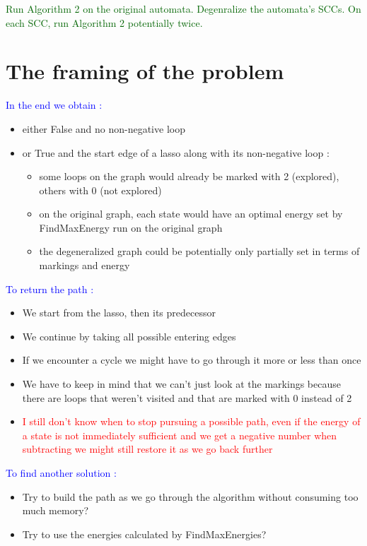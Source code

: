 \documentclass{rapport}
\begin{document}
\vspace{12pt}

\textcolor[HTML]{006400}{Run Algorithm 2 on the original automata. Degenralize the automata’s SCCs. On each SCC, run Algorithm 2 potentially twice.}\\

\newpage

\section{The framing of the problem}

\textcolor{blue}{In the end we obtain :}\\
\begin{itemize}
    \item either False and no non-negative loop
    \item or True and the start edge of a lasso along with its non-negative loop :
    \begin{itemize}
        \item some loops on the graph would already be marked with 2 (explored), others with 0 (not explored)
        \item on the original graph, each state would have an optimal energy set by FindMaxEnergy run on the original graph
        \item the degeneralized graph could be potentially only partially set in terms of markings and energy 
    \end{itemize}
\end{itemize}

\vspace{12pt}

\textcolor{blue}{To return the path :}\\ 
\begin{itemize}
    \item We start from the lasso, then its predecessor
    \item We continue by taking all possible entering edges
    \item If we encounter a cycle we might have to go through it more or less than once
    \item We have to keep in mind that we can't just look at the markings because there are loops that weren't visited and that are marked with 0 instead of 2
    \item \textcolor{red}{I still don’t know when to stop pursuing a possible path, even if the energy of a state is not immediately sufficient and we get a negative number when subtracting we might still restore it as we go back further}
\end{itemize}

\vspace{12pt}

\textcolor{blue}{To find another solution :}\\
\begin{itemize}
    \item Try to build the path as we go through the algorithm without consuming too much memory?
    \item Try to use the energies calculated by FindMaxEnergies?
\end{itemize}
\end{document}
